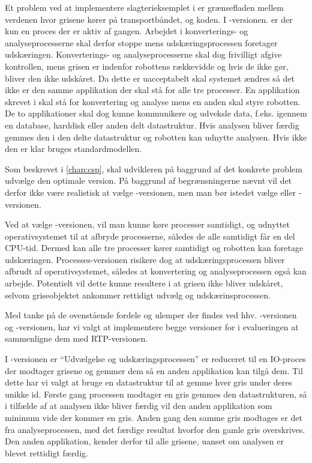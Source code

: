 Et problem ved at implementere slagterieksemplet i \pycsp er  grænsefladen mellem verdenen hvor grisene kører på transportbåndet, og  koden. I -versionen.   er der kun  en proces  der er aktiv af gangen. Arbejdet i  konverterings- og analyseprocesserne skal derfor stoppe  mens  udskæringsprocessen foretager udskæringen.  Konverterings- og analyseprocesserne  skal dog frivilligt afgive kontrollen, mens grisen er indenfor robottens rækkevidde og hvis de ikke gør, bliver den ikke udskåret. Da dette er uacceptabelt skal systemet ændres så det ikke er den samme applikation der skal stå for alle tre processer. En applikation skrevet i \pycsp skal stå for konvertering og analyse mens en anden skal styre robotten. De to applikationer skal dog kunne kommunikere og  udveksle data, f.eks. igennem en database, harddisk eller anden delt datastruktur. Hvis analysen bliver færdig gemmes den i den delte datastruktur og robotten kan udnytte analysen. Hvis ikke den er klar bruges standardmodellen.    

Som beskrevet i \autoref{chap:csp}, skal udvikleren på baggrund af det konkrete problem  udvælge den optimale \pycsp version. På baggrund af begrænsningerne nævnt vil det derfor ikke være realistisk at vælge -versionen, men man bør istedet vælge  eller -versionen.

Ved at vælge -versionen, vil man kunne køre processer samtidigt, og udnyttet operativsystemet til at afbryde processerne, således de alle samtidigt får en del CPU-tid. Dermed kan alle tre processer kører samtidigt og robotten kan foretage udskæringen. Processes-versionen risikere dog at udskæringsprocessen bliver afbrudt af operativsystemet, således at konvertering og  analyseprocessen også kan arbejde. Potentielt vil dette kunne resultere i at grisen ikke bliver udskåret, selvom griseobjektet ankommer rettidigt udvælg og udskærinsprocessen.

Med tanke på de ovenstående fordele og ulemper der findes ved hhv.  -versionen og -versionen,  har vi valgt at implementere begge versioner for i evalueringen at sammenligne dem med RTP-versionen.

I -versionen er ``Udvælgelse og udskæringsprocessen'' er reduceret til en IO-proces der modtager grisene og gemmer dem så en anden applikation kan tilgå dem. Til dette har vi valgt at bruge en  datastruktur til at gemme  hver gris under deres unikke id. Første gang processen modtager en gris gemmes den datastrukturen, så i tilfælde af at analysen ikke bliver færdig vil den anden applikation som minimum vide der kommer en gris. Anden gang den samme gris modtages er det fra analyseprocessen, med det færdige resultat hvorfor  den gamle gris overskrives. Den anden applikation, kender derfor til alle grisene, uanset om analysen er blevet rettidigt færdig.

